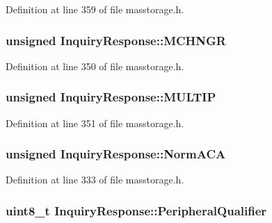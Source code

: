 \-Definition at line 359 of file masstorage.\-h.

\hypertarget{struct_inquiry_response_ac4236ae883e8948bc73e91b6ad091ba8}{
\subsubsection[{\-M\-C\-H\-N\-G\-R}]{\setlength{\rightskip}{0pt plus 5cm}unsigned {\bf \-Inquiry\-Response\-::\-M\-C\-H\-N\-G\-R}}}\label{struct_inquiry_response_ac4236ae883e8948bc73e91b6ad091ba8}


\-Definition at line 350 of file masstorage.\-h.

\hypertarget{struct_inquiry_response_a6a3fdde354529eb47ea3f43975bc224d}{
\subsubsection[{\-M\-U\-L\-T\-I\-P}]{\setlength{\rightskip}{0pt plus 5cm}unsigned {\bf \-Inquiry\-Response\-::\-M\-U\-L\-T\-I\-P}}}\label{struct_inquiry_response_a6a3fdde354529eb47ea3f43975bc224d}


\-Definition at line 351 of file masstorage.\-h.

\hypertarget{struct_inquiry_response_a02cb9a4f4f1a080853eeb3fe3a97b6fe}{
\subsubsection[{\-Norm\-A\-C\-A}]{\setlength{\rightskip}{0pt plus 5cm}unsigned {\bf \-Inquiry\-Response\-::\-Norm\-A\-C\-A}}}\label{struct_inquiry_response_a02cb9a4f4f1a080853eeb3fe3a97b6fe}


\-Definition at line 333 of file masstorage.\-h.

\hypertarget{struct_inquiry_response_a8e8f2cb6b5a0d1ed2c300155bf2b3faa}{
\subsubsection[{\-Peripheral\-Qualifier}]{\setlength{\rightskip}{0pt plus 5cm}uint8\-\_\-t {\bf \-Inquiry\-Response\-::\-Peripheral\-Qualifier}}}\label{struct_inquiry_response_a8e8f2cb6b5a0d1ed2c300155bf2b3faa}


